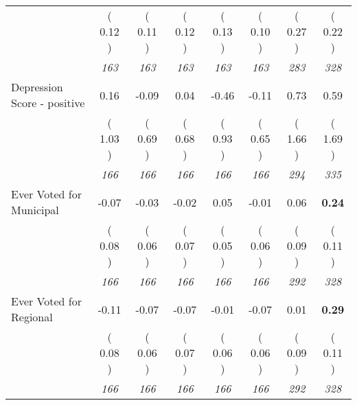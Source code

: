 \begin{tabular}{l c c c c c c c}
& (     0.12 ) & (     0.11 ) & (     0.12 ) & (     0.13 ) & (     0.10 ) & (     0.27 ) & (     0.22 ) \\
& \textit{ 163 } & \textit{ 163 } & \textit{ 163 } & \textit{ 163 } & \textit{ 163 } & \textit{ 283 } & \textit{ 328 } \\
Depression Score - positive &      0.16 &     -0.09 &      0.04 &     -0.46 &     -0.11 &      0.73 &      0.59 \\
& (     1.03 ) & (     0.69 ) & (     0.68 ) & (     0.93 ) & (     0.65 ) & (     1.66 ) & (     1.69 ) \\
& \textit{ 166 } & \textit{ 166 } & \textit{ 166 } & \textit{ 166 } & \textit{ 166 } & \textit{ 294 } & \textit{ 335 } \\
Ever Voted for Municipal &     -0.07 &     -0.03 &     -0.02 &      0.05 &     -0.01 &      0.06 & \textbf{      0.24 } \\
& (     0.08 ) & (     0.06 ) & (     0.07 ) & (     0.05 ) & (     0.06 ) & (     0.09 ) & (     0.11 ) \\
& \textit{ 166 } & \textit{ 166 } & \textit{ 166 } & \textit{ 166 } & \textit{ 166 } & \textit{ 292 } & \textit{ 328 } \\
Ever Voted for Regional &     -0.11 &     -0.07 &     -0.07 &     -0.01 &     -0.07 &      0.01 & \textbf{      0.29 } \\
& (     0.08 ) & (     0.06 ) & (     0.07 ) & (     0.06 ) & (     0.06 ) & (     0.09 ) & (     0.11 ) \\
& \textit{ 166 } & \textit{ 166 } & \textit{ 166 } & \textit{ 166 } & \textit{ 166 } & \textit{ 292 } & \textit{ 328 } \\
\bottomrule
\end{tabular}

